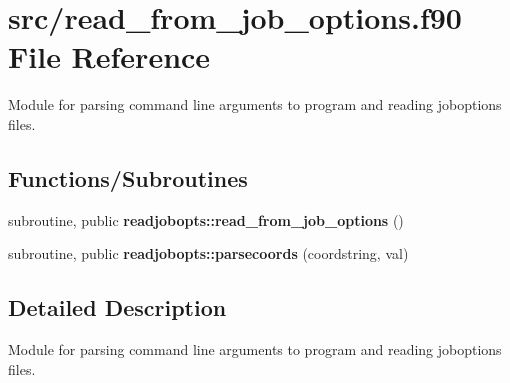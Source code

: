 \hypertarget{read__from__job__options_8f90}{}\section{src/read\+\_\+from\+\_\+job\+\_\+options.f90 File Reference}
\label{read__from__job__options_8f90}


Module for parsing command line arguments to program and reading joboptions files.  


\subsection*{Functions/\+Subroutines}
\begin{DoxyCompactItemize}
\item 
\hypertarget{namespacereadjobopts_abd945e997fbf5fd8e3d270408ed3e623}{}subroutine, public {\bfseries readjobopts\+::read\+\_\+from\+\_\+job\+\_\+options} ()\label{namespacereadjobopts_abd945e997fbf5fd8e3d270408ed3e623}

\item 
\hypertarget{namespacereadjobopts_a8c5d2d3d6626541725275c794afb0ac0}{}subroutine, public {\bfseries readjobopts\+::parsecoords} (coordstring, val)\label{namespacereadjobopts_a8c5d2d3d6626541725275c794afb0ac0}

\end{DoxyCompactItemize}


\subsection{Detailed Description}
Module for parsing command line arguments to program and reading joboptions files. 

